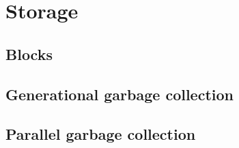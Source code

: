 \section{Storage}

\subsection{Blocks}

\subsection{Generational garbage collection}

\subsection{Parallel garbage collection}



